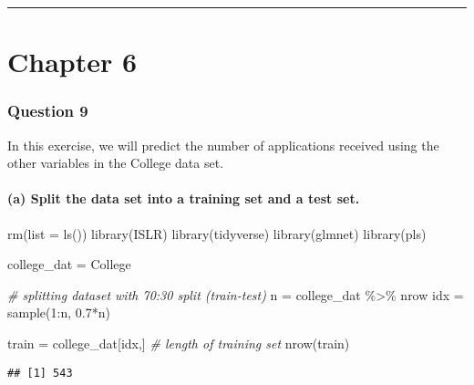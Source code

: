 \documentclass[
]{article}
\newenvironment{Shaded}{\begin{snugshade}}{\end{snugshade}}
\newcommand{\AttributeTok}[1]{\textcolor[rgb]{0.77,0.63,0.00}{#1}}
\newcommand{\CommentTok}[1]{\textcolor[rgb]{0.56,0.35,0.01}{\textit{#1}}}
\newcommand{\DecValTok}[1]{\textcolor[rgb]{0.00,0.00,0.81}{#1}}
\newcommand{\FloatTok}[1]{\textcolor[rgb]{0.00,0.00,0.81}{#1}}
\newcommand{\FunctionTok}[1]{\textcolor[rgb]{0.00,0.00,0.00}{#1}}
\newcommand{\NormalTok}[1]{#1}
\newcommand{\OtherTok}[1]{\textcolor[rgb]{0.56,0.35,0.01}{#1}}
\newcommand{\SpecialCharTok}[1]{\textcolor[rgb]{0.00,0.00,0.00}{#1}}
\begin{document}
\begin{center}\rule{0.5\linewidth}{0.5pt}\end{center}

\hypertarget{chapter-6}{%
\section{Chapter 6}\label{chapter-6}}

\hypertarget{question-9}{%
\subsubsection{Question 9}\label{question-9}}

In this exercise, we will predict the number of applications received
using the other variables in the College data set.

\hypertarget{a-split-the-data-set-into-a-training-set-and-a-test-set.}{%
\paragraph{(a) Split the data set into a training set and a test
set.}\label{a-split-the-data-set-into-a-training-set-and-a-test-set.}}

\begin{Shaded}
\begin{Highlighting}[]
\FunctionTok{rm}\NormalTok{(}\AttributeTok{list =} \FunctionTok{ls}\NormalTok{())}
\FunctionTok{library}\NormalTok{(ISLR)}
\FunctionTok{library}\NormalTok{(tidyverse)}
\FunctionTok{library}\NormalTok{(glmnet)}
\FunctionTok{library}\NormalTok{(pls)}

\NormalTok{college\_dat }\OtherTok{=}\NormalTok{ College}

\CommentTok{\# splitting dataset with 70:30 split (train{-}test)}
\NormalTok{n }\OtherTok{=}\NormalTok{ college\_dat }\SpecialCharTok{\%\textgreater{}\%}\NormalTok{ nrow}
\NormalTok{idx }\OtherTok{=} \FunctionTok{sample}\NormalTok{(}\DecValTok{1}\SpecialCharTok{:}\NormalTok{n, }\FloatTok{0.7}\SpecialCharTok{*}\NormalTok{n)}


\NormalTok{train }\OtherTok{=}\NormalTok{ college\_dat[idx,]}
\CommentTok{\# length of training set}
\FunctionTok{nrow}\NormalTok{(train)}
\end{Highlighting}
\end{Shaded}

\begin{verbatim}
## [1] 543
\end{verbatim}
\end{document}
